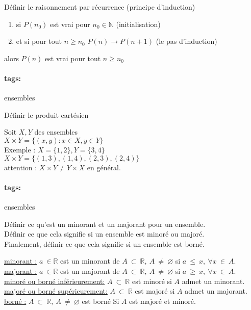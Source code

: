 \documentclass[12pt]{article}
\newcommand*{\xfield}[1]{\begin{mdframed}\centering #1\end{mdframed}\bigskip}
\newenvironment{note}{}{}
\newcommand*{\tags}[1]{\paragraph{tags: }#1}
\begin{document}
\begin{note}
	\xfield{Définir le raisonnement par récurrence (principe d'induction)}
	\xfield{\begin{enumerate}
	\item si $P(n_0)$ est vrai pour $n_0 \in \mathbb{N}$ (initialisation)
	\item et si pour tout $n \ge n_0$ $P(n) \rightarrow P(n+1)$ (le pas d'induction)
	\end{enumerate}
	alors $P(n)$ est vrai pour tout $n \ge n_0$}
\end{note}
\begin{note}
	\tags{ensembles}
	\xfield{Définir le produit cartésien}
	\xfield{Soit $X,Y$ des ensembles \\
	$X \times Y = \{ (x,y) : x \in X, y \in Y \} $\\
	Exemple : $X = \{ 1,2 \} , Y = \{ 3,4 \} $\\
	$X \times Y = \{ (1,3),(1,4),(2,3),(2,4)\}$ \\
	attention : $X \times Y \neq Y \times X$ en général.}
\end{note}
\begin{note}
	\tags{ensembles}
    \xfield{
        Définir ce qu'est un minorant et un majorant pour un ensemble.\\
        Définir ce que cela signifie si un ensemble est minoré ou majoré.\\
        Finalement, définir ce que cela signifie si un ensemble est borné.}
    \xfield{
        \underline{minorant :} $a\ \in \mathbb{R}$ est un minorant de $A\ \subset\ \mathbb{R},\ A\ \neq\ \varnothing$ si $a\ \le\ x,\ \forall x\ \in\ A$.\\        
        \underline{majorant :} $a\ \in \mathbb{R}$ est un majorant de $A\ \subset\ \mathbb{R},\ A\ \neq\ \varnothing$ si $a\ \ge\ x,\ \forall x\ \in\ A$.\\
        \underline{minoré ou borné inférieurement:} $A\ \subset\ \mathbb{R}$ est minoré si $A$ admet un minorant.\\
        \underline{majoré ou borné supérieurement:} $A\ \subset\ \mathbb{R}$ est majoré si $A$ admet un majorant.\\
        \underline{borné :} $A\ \subset\ \mathbb{R},\ A\ \neq\ \varnothing$ est borné Si $A$ est majoré et minoré.}
\end{note}
\end{document}

